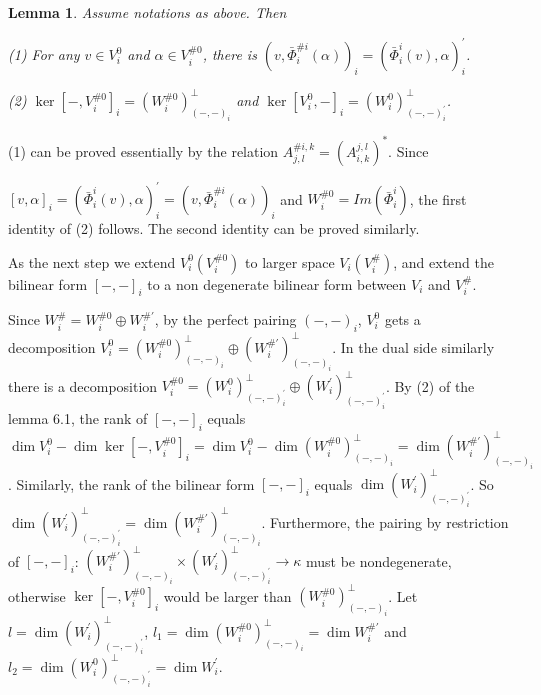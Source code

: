 \def\CTEXPreproc{Created by ctex v0.2.12, don't edit!}\documentclass[11pt]{article}
\newtheorem{lem}{Lemma}[section]
\begin{document}
\begin{lem} Assume notations  as above. Then

\noindent(1) For any $v\in V^0 _i $ and  $\alpha \in V^{\# 0}_i$, there is $( v,  \bar{\Phi}^{\# i}_i (\alpha )   )_i  = ( \bar{\Phi}^i _i (v) ,\alpha  )^{'} _i    $.

\noindent(2) $\ker [-, V^{\# 0}_i  ]_i = ( W^{\# 0}_i )^{\perp} _{(-,-)_i   } $ and $\ker [ V^0 _i  ,-]_i = ( W^0 _i  )^{\perp} _{(-,-)^{'}_i }  $.

\end{lem}

\begin{pf}
(1) can be proved essentially by the relation $ A^{\# i,k} _{j,l} = ( A^{j,l} _{i,k}   )^{*}   $. Since

 \noindent $ [ v ,\alpha ]_i =( \bar{\Phi}^i _i (v),  \alpha   )^{'} _i =( v,  \bar{\Phi}^{\# i}_i (\alpha )   )_i  $ and $W^{\# 0}_i = Im ( \bar{\Phi}^i _i )$, the first identity of (2) follows. The second identity can be proved similarly.\\

\end{pf}

 As the next step we extend $V^0 _i ( V^{\# 0}_i  )$ to larger space $V_i (V^{\#}_i )$, and extend the bilinear form $[-,-]_i$ to a non degenerate bilinear form between $V_i$ and $V^{\#}_i$.

 Since $W^{\#} _i = W^{\# 0}_i \oplus W^{\# '}_i $, by the perfect pairing $(-,-)_i$, $V^0 _i$ gets a decomposition
$V^0 _i = (W^{\# 0}_i )^{\perp}_{(-,-)_i } \oplus (W^{\# '}_i )^{\perp}_{(-,-)_i} $. In the dual side similarly there is a decomposition
$V^{\# 0}_i = (W^{ 0}_i )^{\perp}_{(-,-)^{'}_i } \oplus (W^{ '}_i )^{\perp} _{(-,-)^{'}_i }  $. By (2) of the lemma 6.1, the rank of $[-,-]_i $
equals $\dim V^0 _i - \dim \ker [-, V^{\# 0}_i  ]_i =\dim V^0 _i - \dim ( W^{\# 0} _i   )^{\perp}_{(-,-)_i } = \dim ( W^{\# '} _i   )^{\perp}_{(-,-)_i }$. Similarly, the rank of the bilinear form $[-,-]_i $ equals
$\dim (  W^{'} _i  )^{\perp}_{(-,-)^{'}_i }$. So $\dim (  W^{'} _i  )^{\perp}_{(-,-)^{'}_i }= \dim ( W^{\# '} _i   )^{\perp}_{(-,-)_i }  $.  Furthermore, the pairing by restriction of $[-,-]_i$:
$( W^{\# '} _i  )^{\perp}_{(-,-)_i } \times (  W^{'} _i  )^{\perp}_{(-,-)^{'}_i } \rightarrow \kappa   $ must be nondegenerate, otherwise $\ker [-, V^{\# 0}_i  ]_i$
would be larger than $ (W^{\# 0}_i )^{\perp}_{(-,-)_i }  $.
Let $l= \dim  (  W^{'} _i  )^{\perp}_{(-,-)^{'}_i } $,
$l_1 =\dim  (  W^{\# 0} _i  )^{\perp}_{(-,-)_i } =\dim W^{\# '}_i $ and
$l_2 =\dim  (  W^{0} _i  )^{\perp}_{(-,-)^{'}_i }=\dim W^{'}_i $.
\end{document}
